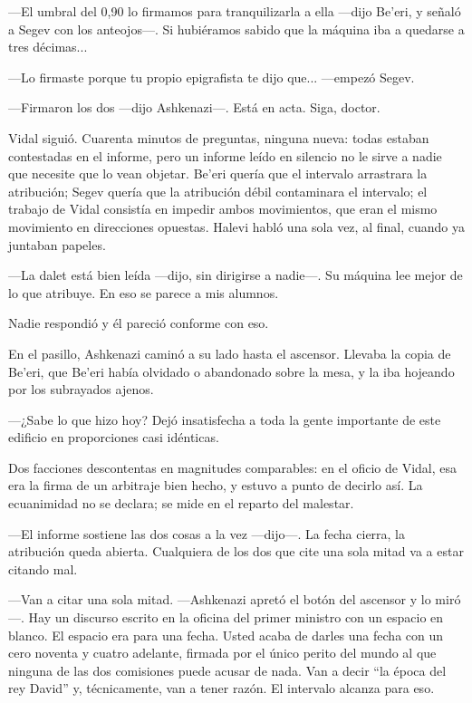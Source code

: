 ---El umbral del 0,90 lo firmamos para tranquilizarla a ella ---dijo Be'eri, y señaló a Segev con los anteojos---. Si hubiéramos sabido que la máquina iba a quedarse a tres décimas...

---Lo firmaste porque tu propio epigrafista te dijo que... ---empezó Segev.

---Firmaron los dos ---dijo Ashkenazi---. Está en acta. Siga, doctor.

Vidal siguió. Cuarenta minutos de preguntas, ninguna nueva: todas estaban contestadas en el informe, pero un informe leído en silencio no le sirve a nadie que necesite que lo vean objetar. Be'eri quería que el intervalo arrastrara la atribución; Segev quería que la atribución débil contaminara el intervalo; el trabajo de Vidal consistía en impedir ambos movimientos, que eran el mismo movimiento en direcciones opuestas. Halevi habló una sola vez, al final, cuando ya juntaban papeles.

---La dalet está bien leída ---dijo, sin dirigirse a nadie---. Su máquina lee mejor de lo que atribuye. En eso se parece a mis alumnos.

Nadie respondió y él pareció conforme con eso.

En el pasillo, Ashkenazi caminó a su lado hasta el ascensor. Llevaba la copia de Be'eri, que Be'eri había olvidado o abandonado sobre la mesa, y la iba hojeando por los subrayados ajenos.

---¿Sabe lo que hizo hoy? Dejó insatisfecha a toda la gente importante de este edificio en proporciones casi idénticas.

Dos facciones descontentas en magnitudes comparables: en el oficio de Vidal, esa era la firma de un arbitraje bien hecho, y estuvo a punto de decirlo así. La ecuanimidad no se declara; se mide en el reparto del malestar.

---El informe sostiene las dos cosas a la vez ---dijo---. La fecha cierra, la atribución queda abierta. Cualquiera de los dos que cite una sola mitad va a estar citando mal.

---Van a citar una sola mitad. ---Ashkenazi apretó el botón del ascensor y lo miró---. Hay un discurso escrito en la oficina del primer ministro con un espacio en blanco. El espacio era para una fecha. Usted acaba de darles una fecha con un cero noventa y cuatro adelante, firmada por el único perito del mundo al que ninguna de las dos comisiones puede acusar de nada. Van a decir ``la época del rey David'' y, técnicamente, van a tener razón. El intervalo alcanza para eso.

